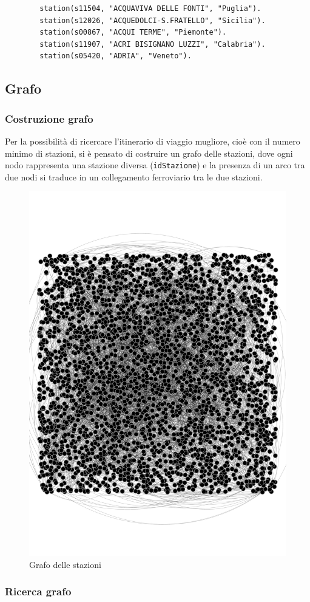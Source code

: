 \documentclass[italian,12pt,a4paper]{article}
\begin{document}
\begin{small}
	
	\begin{verbatim}
		station(s11504, "ACQUAVIVA DELLE FONTI", "Puglia").
		station(s12026, "ACQUEDOLCI-S.FRATELLO", "Sicilia").
		station(s00867, "ACQUI TERME", "Piemonte").
		station(s11907, "ACRI BISIGNANO LUZZI", "Calabria").
		station(s05420, "ADRIA", "Veneto").
	\end{verbatim}
\end{small}

\subsection{Grafo}

\subsubsection{Costruzione grafo}
	Per la possibilità di ricercare l'itinerario di viaggio mugliore, cioè con il numero minimo di stazioni, si è pensato di costruire un grafo delle stazioni, dove ogni nodo rappresenta una stazione diversa (\texttt{idStazione}) e la presenza di un arco tra due nodi si traduce in un collegamento ferroviario tra le due stazioni.
	\\
	\begin{figure}[!h]
		\centering
		\includegraphics[width=0.55\linewidth]{img/stations}
		\caption{Grafo delle stazioni}
		\label{fig:stationsgraph}
	\end{figure}
	
\subsubsection{Ricerca grafo}
	
\end{document}
